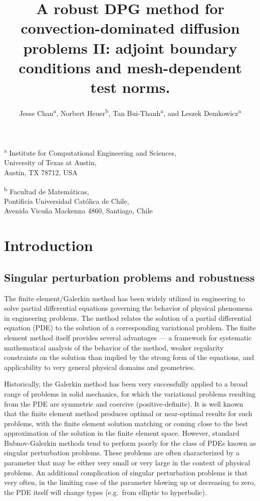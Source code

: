 \documentclass[11pt,onecolumn]{scrartcl}
\author{Jesse Chan\textsuperscript{a}, Norbert Heuer\textsuperscript{b}, Tan Bui-Thanh\textsuperscript{a}, and Leszek Demkowicz\textsuperscript{a}}
\title{A robust DPG method for convection-dominated diffusion problems II: adjoint boundary conditions and mesh-dependent test norms.}
\date{}
\begin{document}
\maketitle
\begin{center}
\textsuperscript{a} Institute for Computational Engineering and Sciences, \\University of Texas at Austin, \\Austin, TX 78712, USA\\
\end{center}

\begin{center}
\textsuperscript{b} Facultad de Matem\'aticas, \\Pontificia Universidad Cat\'olica de Chile,\\
Avenida Vicu\~na Mackenna 4860, Santiago, Chile
\end{center}

\section{Introduction}

\subsection{Singular perturbation problems and robustness}

The finite element/Galerkin method has been widely utilized in engineering to solve partial differential equations governing the behavior of physical phenomena in engineering problems.  The method relates the solution of a partial differential equation (PDE) to the solution of a corresponding variational problem. The finite element method itself provides several advantages --- a framework for systematic mathematical analysis of the behavior of the method, weaker regularity constraints on the solution than implied by the strong form of the equations, and applicability to very general physical domains and geometries. 

Historically, the Galerkin method has been very successfully applied to a broad range of problems in solid mechanics, for which the variational problems resulting from the PDE are symmetric and coercive (positive-definite). It is well known that the finite element method produces optimal or near-optimal results for such problems, with the finite element solution matching or coming close to the best approximation of the solution in the finite element space. However, standard Bubnov-Galerkin methods tend to perform poorly for the class of PDEs known as singular perturbation problems. These problems are often characterized by a parameter that may be either very small or very large in the context of physical problems.  An additional complication of singular perturbation problems is that very often, in the limiting case of the parameter blowing up or decreasing to zero, the PDE itself will change types (e.g.\ from elliptic to hyperbolic).
\end{document}
